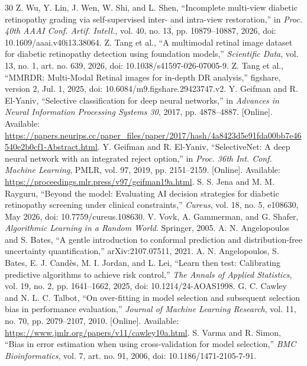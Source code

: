 \documentclass{ieeeaccess}
\begin{document}
\begin{thebibliography}{30}
 Z. Wu, Y. Lin, J. Wen, W. Shi, and L. Shen, ``Incomplete multi-view diabetic retinopathy grading via self-supervised inter- and intra-view restoration,'' in \emph{Proc. 40th AAAI Conf. Artif. Intell.}, vol. 40, no. 13, pp. 10879--10887, 2026, doi: 10.1609/aaai.v40i13.38064.
 Z. Tang et al., ``A multimodal retinal image dataset for diabetic retinopathy detection using foundation models,'' \emph{Scientific Data}, vol. 13, no. 1, art. no. 639, 2026, doi: 10.1038/s41597-026-07005-9.
 Z. Tang et al., ``MMRDR: Multi-Modal Retinal images for in-depth DR analysis,'' figshare, version 2, Jul. 1, 2025, doi: 10.6084/m9.figshare.29423747.v2.
 Y. Geifman and R. El-Yaniv, ``Selective classification for deep neural networks,'' in \emph{Advances in Neural Information Processing Systems 30}, 2017, pp. 4878--4887. [Online]. Available: \url{https://papers.neurips.cc/paper_files/paper/2017/hash/4a8423d5e91fda00bb7e46540e2b0cf1-Abstract.html}.
 Y. Geifman and R. El-Yaniv, ``SelectiveNet: A deep neural network with an integrated reject option,'' in \emph{Proc. 36th Int. Conf. Machine Learning}, PMLR, vol. 97, 2019, pp. 2151--2159. [Online]. Available: \url{https://proceedings.mlr.press/v97/geifman19a.html}.
 S. S. Jena and M. M. Rayguru, ``Beyond the model: Evaluating AI decision strategies for diabetic retinopathy screening under clinical constraints,'' \emph{Cureus}, vol. 18, no. 5, e108630, May 2026, doi: 10.7759/cureus.108630.
 V. Vovk, A. Gammerman, and G. Shafer, \emph{Algorithmic Learning in a Random World}. Springer, 2005.
 A. N. Angelopoulos and S. Bates, ``A gentle introduction to conformal prediction and distribution-free uncertainty quantification,'' arXiv:2107.07511, 2021.
 A. N. Angelopoulos, S. Bates, E. J. Cand\`es, M. I. Jordan, and L. Lei, ``Learn then test: Calibrating predictive algorithms to achieve risk control,'' \emph{The Annals of Applied Statistics}, vol. 19, no. 2, pp. 1641--1662, 2025, doi: 10.1214/24-AOAS1998.
 G. C. Cawley and N. L. C. Talbot, ``On over-fitting in model selection and subsequent selection bias in performance evaluation,'' \emph{Journal of Machine Learning Research}, vol. 11, no. 70, pp. 2079--2107, 2010. [Online]. Available: \url{https://www.jmlr.org/papers/v11/cawley10a.html}.
 S. Varma and R. Simon, ``Bias in error estimation when using cross-validation for model selection,'' \emph{BMC Bioinformatics}, vol. 7, art. no. 91, 2006, doi: 10.1186/1471-2105-7-91.

\end{thebibliography}
\end{document}
